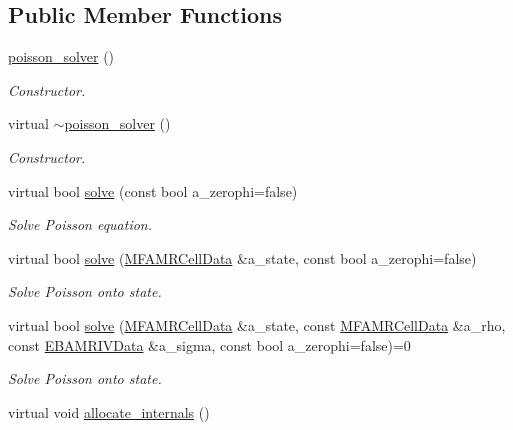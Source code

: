 \subsection*{Public Member Functions}
\begin{DoxyCompactItemize}
\item 
\hyperlink{classpoisson__solver_af59e39a4acd9914bc2514115d7f2a766}{poisson\+\_\+solver} ()
\begin{DoxyCompactList}\small\item\em Constructor. \end{DoxyCompactList}\item 
virtual \hyperlink{classpoisson__solver_af703844cd10b6dbe3875b99bf846d444}{$\sim$poisson\+\_\+solver} ()
\begin{DoxyCompactList}\small\item\em Constructor. \end{DoxyCompactList}\item 
virtual bool \hyperlink{classpoisson__solver_a4c2ab4e4aadb2ea1c3dfb8b8baffbf96}{solve} (const bool a\+\_\+zerophi=false)
\begin{DoxyCompactList}\small\item\em Solve Poisson equation. \end{DoxyCompactList}\item 
virtual bool \hyperlink{classpoisson__solver_a3e1ee9d11b7f2fa3bf8a45ea4ff700aa}{solve} (\hyperlink{type__definitions_8H_aced885351d40daa466564acbee4042d3}{M\+F\+A\+M\+R\+Cell\+Data} \&a\+\_\+state, const bool a\+\_\+zerophi=false)
\begin{DoxyCompactList}\small\item\em Solve Poisson onto state. \end{DoxyCompactList}\item 
virtual bool \hyperlink{classpoisson__solver_a0c8dceb07f9dd75ebaca47b8c01eb825}{solve} (\hyperlink{type__definitions_8H_aced885351d40daa466564acbee4042d3}{M\+F\+A\+M\+R\+Cell\+Data} \&a\+\_\+state, const \hyperlink{type__definitions_8H_aced885351d40daa466564acbee4042d3}{M\+F\+A\+M\+R\+Cell\+Data} \&a\+\_\+rho, const \hyperlink{type__definitions_8H_a6b8fa905d55cbb491b52180386f0e0c1}{E\+B\+A\+M\+R\+I\+V\+Data} \&a\+\_\+sigma, const bool a\+\_\+zerophi=false)=0
\begin{DoxyCompactList}\small\item\em Solve Poisson onto state. \end{DoxyCompactList}\item 
virtual void \hyperlink{classpoisson__solver_afd3fb516f056a40d829ce55e1e9c7b53}{allocate\+\_\+internals} ()

\end{DoxyCompactItemize}
